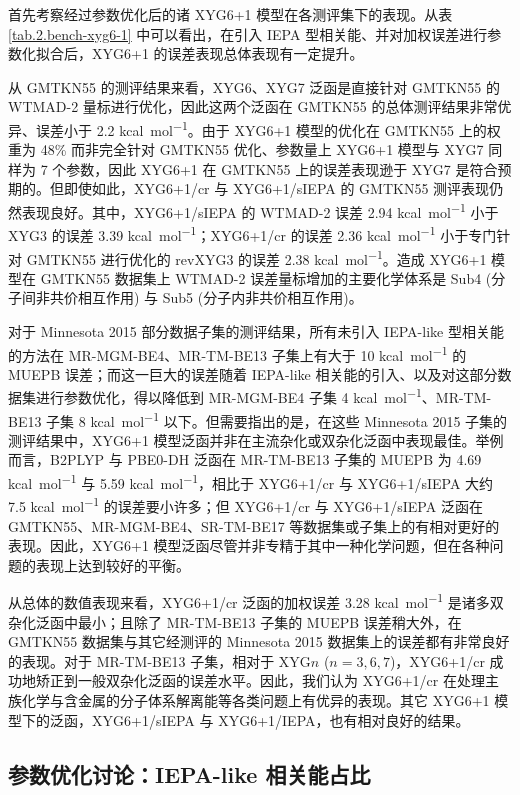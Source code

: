 首先考察经过参数优化后的诸 XYG6+1 模型在各测评集下的表现。从表 \ref{tab.2.bench-xyg6-1} 中可以看出，在引入 IEPA 型相关能、并对加权误差进行参数化拟合后，XYG6+1 的误差表现总体表现有一定提升。

从 GMTKN55 的测评结果来看，XYG6、XYG7 泛函是直接针对 GMTKN55 的 WTMAD-2 量标进行优化，因此这两个泛函在 GMTKN55 的总体测评结果非常优异、误差小于 2.2 \si{kcal.mol^{-1}}。由于 XYG6+1 模型的优化在 GMTKN55 上的权重为 48\% 而非完全针对 GMTKN55 优化、参数量上 XYG6+1 模型与 XYG7 同样为 7 个参数，因此 XYG6+1 在 GMTKN55 上的误差表现逊于 XYG7 是符合预期的。但即使如此，XYG6+1/cr 与 XYG6+1/sIEPA 的 GMTKN55 测评表现仍然表现良好。其中，XYG6+1/sIEPA 的 WTMAD-2 误差 2.94 \si{kcal.mol^{-1}} 小于 XYG3 的误差 3.39 \si{kcal.mol^{-1}}；XYG6+1/cr 的误差 2.36 \si{kcal.mol^{-1}} 小于专门针对 GMTKN55 进行优化的 revXYG3 的误差 2.38 \si{kcal.mol^{-1}}。造成 XYG6+1 模型在 GMTKN55 数据集上 WTMAD-2 误差量标增加的主要化学体系是 Sub4 (分子间非共价相互作用) 与 Sub5 (分子内非共价相互作用)。

对于 Minnesota 2015 部分数据子集的测评结果，所有未引入 IEPA-like 型相关能的方法在 MR-MGM-BE4、MR-TM-BE13 子集上有大于 10 \si{kcal.mol^{-1}} 的 MUEPB 误差；而这一巨大的误差随着 IEPA-like 相关能的引入、以及对这部分数据集进行参数优化，得以降低到 MR-MGM-BE4 子集 4 \si{kcal.mol^{-1}}、MR-TM-BE13 子集 8 \si{kcal.mol^{-1}} 以下。但需要指出的是，在这些 Minnesota 2015 子集的测评结果中，XYG6+1 模型泛函并非在主流杂化或双杂化泛函中表现最佳。举例而言，B2PLYP 与 PBE0-DH 泛函在 MR-TM-BE13 子集的 MUEPB 为 4.69 \si{kcal.mol^{-1}} 与 5.59 \si{kcal.mol^{-1}}，相比于 XYG6+1/cr 与 XYG6+1/sIEPA 大约 7.5 \si{kcal.mol^{-1}} 的误差要小许多；但 XYG6+1/cr 与 XYG6+1/sIEPA 泛函在 GMTKN55、MR-MGM-BE4、SR-TM-BE17 等数据集或子集上的有相对更好的表现。因此，XYG6+1 模型泛函尽管并非专精于其中一种化学问题，但在各种问题的表现上达到较好的平衡。

从总体的数值表现来看，XYG6+1/cr 泛函的加权误差 3.28 \si{kcal.mol^{-1}} 是诸多双杂化泛函中最小；且除了 MR-TM-BE13 子集的 MUEPB 误差稍大外，在 GMTKN55 数据集与其它经测评的 Minnesota 2015 数据集上的误差都有非常良好的表现。对于 MR-TM-BE13 子集，相对于 XYG$n$ ($n=3,6,7$)，XYG6+1/cr 成功地矫正到一般双杂化泛函的误差水平。因此，我们认为 XYG6+1/cr 在处理主族化学与含金属的分子体系解离能等各类问题上有优异的表现。其它 XYG6+1 模型下的泛函，XYG6+1/sIEPA 与 XYG6+1/IEPA，也有相对良好的结果。

\subsection{参数优化讨论：IEPA-like 相关能占比}
\label{sec.2.proportion-iepa-like}

